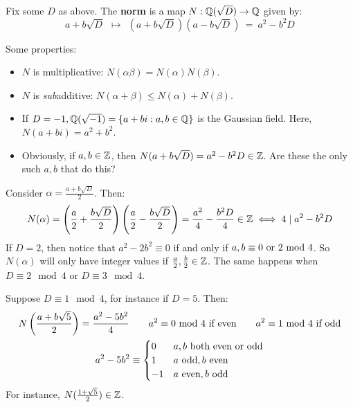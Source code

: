 \begin{defn}
    Fix some $ D $ as above. The \textbf{norm} is a map $ N: \mathbb{Q}(\sqrt{D}) \rightarrow \mathbb{Q} $
    given by:
    \begin{equation*}
        a+b\sqrt{D} \ \ \longmapsto \ \ (a+b\sqrt{D})(a-b\sqrt{D}) \ = \ a^{2}-b^{2}D
    \end{equation*}
\end{defn}
Some properties:
\begin{itemize}
    \item $ N $ is multiplicative: $ N(\alpha\beta) = N(\alpha)N(\beta) $.
    \item $ N $ is \textit{sub}additive: $ N(\alpha + \beta) \leq N(\alpha) + N(\beta) $.
    \item If $ D = -1, \mathbb{Q}(\sqrt{-1}) = \left\{{a+bi:a,b \in \mathbb{Q}}\right\} $ is the Gaussian field.
        Here, $ N(a+bi) = a^{2}+b^{2} $.
    \item Obviously, if $ a, b \in \mathbb{Z} $, then $ N(a+b\sqrt{D}) = a^{2}-b^{2}D \in \mathbb{Z} $.
        Are these the only such $ a, b $ that do this?
\end{itemize}
Consider $ \alpha = \frac{a+b\sqrt{D}}{2} $. Then:
\begin{equation*}
    N(\alpha) = \left( \frac{a}{2} + \frac{b\sqrt{D}}{2} \right)
    \left( \frac{a}{2}-\frac{b\sqrt{D}}{2} \right)
    = \frac{a^{2}}{4} - \frac{b^{2}D}{4} \in \mathbb{Z} \iff 4 \mid a^{2} - b^{2}D
\end{equation*}
If $ D = 2 $, then notice that $ a^{2} - 2b^{2} \equiv 0 $ if and only if
$ a, b \equiv 0 \textrm{ or } 2 \ \mathrm{mod}\ 4 $. So $ N(\alpha) $ will only have integer values if
$ \frac{a}{2}, \frac{b}{2} \in \mathbb{Z} $.
The same happens when $ D \equiv 2 \mod 4 $ or $ D \equiv 3 \mod 4 $.

Suppose $ D \equiv 1 \mod 4 $, for instance if $ D = 5 $. Then:
\begin{gather*}
    N \left( \frac{a+b\sqrt{5}}{2} \right) = \frac{a^{2}-5b^{2}}{4} \qquad
    a^{2} \equiv 0 \ \mathrm{mod}\ 4 \textrm{ if even} \qquad
    a^{2} \equiv 1 \ \mathrm{mod}\ 4 \textrm{ if odd} \\
    a^{2}-5b^{2} \equiv
    \begin{cases}
    0 & a, b \textrm{ both even or odd} \\
    1 & a \textrm{ odd}, b \textrm{ even} \\
    -1 & a \textrm{ even}, b \textrm{ odd}
    \end{cases}
\end{gather*}
For instance, $ N(\frac{1+\sqrt{5}}{2}) \in \mathbb{Z} $.

